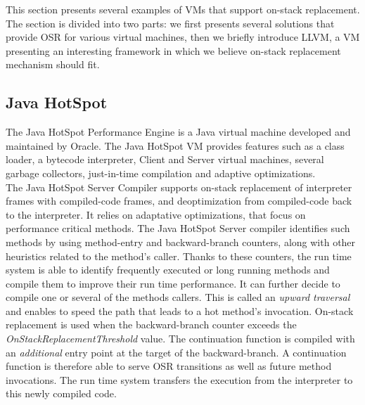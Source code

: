 This section presents several examples of VMs that support on-stack replacement. 
The section is divided into two parts: we first presents several solutions that provide OSR for various virtual machines, then we briefly introduce LLVM, a VM presenting an interesting framework in which we believe on-stack replacement mechanism should fit.\\ 

\subsection{Java HotSpot}\label{HotSpot}

The Java HotSpot Performance Engine is a Java virtual machine developed and maintained by Oracle.
The Java HotSpot VM provides features such as a class loader, a bytecode interpreter, Client and Server virtual machines, several garbage collectors, just-in-time compilation and adaptive optimizations.\\

The Java HotSpot Server Compiler\cite{paleczny2001java} supports on-stack replacement of interpreter frames with compiled-code frames, and deoptimization from compiled-code back to the interpreter.
It relies on adaptative optimizations, that focus on performance critical methods\cite{paleczny2001java, holzle1994third}.
The Java HotSpot Server compiler identifies such methods by using method-entry and backward-branch counters, along with other heuristics related to the method's caller.
Thanks to these counters, the run time system is able to identify frequently executed or long running methods and compile them to improve their run time performance.
It can further decide to compile one or several of the methods callers.
This is called an \textit{upward traversal} and enables to speed the path that leads to a hot method's invocation.  
On-stack replacement is used when the backward-branch counter exceeds the \textit{OnStackReplacementThreshold} value.
The continuation function is compiled with an \textit{additional} entry point at the target of the backward-branch.
A continuation function is therefore able to serve OSR transitions as well as future method invocations.
The run time system transfers the execution from the interpreter to this newly compiled code.\\

